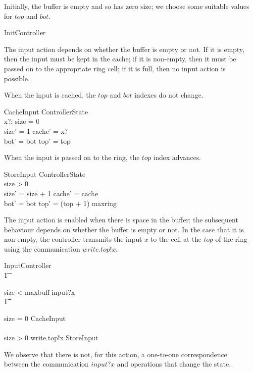 \documentclass{article}
\begin{document}
Initially, the buffer is empty and so has zero size; we choose some
suitable values for $top$ and $bot$.
\begin{zed}
  InitController 
\end{zed}
The input action depends on whether the buffer is empty or not.  If it
is empty, then the input must be kept in the cache; if it is
non-empty, then it must be passed on to the appropriate ring cell; if
it is full, then no input action is possible.

When the input is cached, the $top$ and $bot$ indexes do not change.
\begin{schema}{CacheInput}
  \Delta ControllerState
  \\ %
  x?: \nat
  \where %
  size = 0
  \\ %
  size' = 1 \land cache' = x?
  \\ %
  bot' = bot \land top' = top
\end{schema}
When the input is passed on to the ring, the $top$ index advances.
\begin{schema}{StoreInput}
  \Delta ControllerState
  \\ %
  \where %
  size > 0
  \\ %
  size' = size + 1 \land cache' = cache
  \\ %
  bot' = bot \land top' = (top + 1) \mod maxring
\end{schema}
The input action is enabled when there is space in the buffer; the
subsequent behaviour depends on whether the buffer is empty or not.  In
the case that it is non-empty, the controller transmits the input $x$
to the cell at the $top$ of the ring using the communication
$write.top!x$.
\begin{zed}
  InputController 
  \\ %
  \t1
  \begin{block}
    size < maxbuff \guard input?x \then
    \\ %
    \t1 \begin{block}
      size = 0 \guard CacheInput
      \\ %
      \extchoice
      \\ %
      size > 0 \guard write.top!x \then StoreInput
    \end{block}
  \end{block}
\end{zed}
We observe that there is not, for this action, a one-to-one
correspondence between the communication $input?x$ and operations that
change the state.
\end{document}
